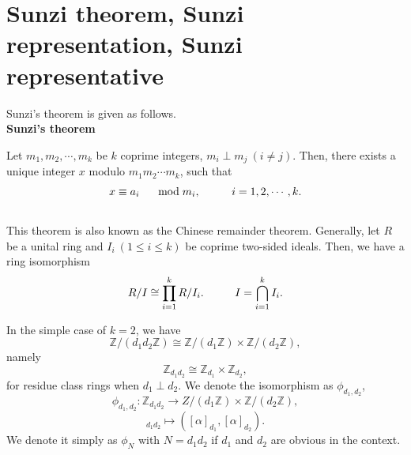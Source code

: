 \documentclass[12pt]{iopart}
\newcommand{\sbt}{\,\begin{picture}(-1,1)(-1,-3)\circle*{2}\end{picture}\ }
\begin{document}
\newpage

\section{Sunzi theorem, Sunzi representation, Sunzi representative}

Sunzi's theorem is given as follows.
\\

\noindent
{\bf Sunzi's theorem}

Let \(m_1,m_2,\cdots,m_k\) be \(k\) coprime integers,
\(m_i\perp m_j\ (i\ne j)\).
Then, there exists a unique integer \(x\) modulo \(m_1m_2\cdots m_k\),
such that
\begin{equation}
x\equiv a_i
\hspace{5mm}\bmod m_i,
\hspace{10mm}
i=1,2,\cdots,k.
\end{equation}
\ \\

This theorem is also known as the Chinese remainder theorem.
%
Generally, let \(R\) be a unital ring and
\(I_i\ (1\le i\le k)\) be coprime two-sided ideals.
Then, we have a ring isomorphism
\begin{equation}
R/I\cong\prod_{i=1}^kR/I_i.
\hspace{10mm}
I=\bigcap_{i=1}^kI_i.
\end{equation}

In the simple case of \(k=2\), we have
\begin{equation}
\mathbb Z/(d_1d_2\mathbb Z)
\cong
\mathbb Z/(d_1\mathbb Z)\times\mathbb Z/(d_2\mathbb Z),
\end{equation}
namely
\begin{equation}
\mathbb Z_{d_1d_2}\cong\mathbb Z_{d_1}\times\mathbb Z_{d_2},
\end{equation}
for residue class rings when \(d_1\perp d_2\).
We denote the isomorphism as \(\phi_{d_1,d_2}\),
\begin{equation}
\phi_{d_1,d_2}: \mathbb Z_{d_1d_2}\rightarrow Z/(d_1\mathbb Z)\times\mathbb Z/(d_2\mathbb Z),
\end{equation}
\begin{equation}
[\alpha]_{d_1d_2}\mapsto([\alpha]_{d_1},[\alpha]_{d_2}).
\end{equation}
We denote it simply as \(\phi_N\) with \(N=d_1d_2\)
if \(d_1\) and \(d_2\) are obvious in the context.
\end{document}
